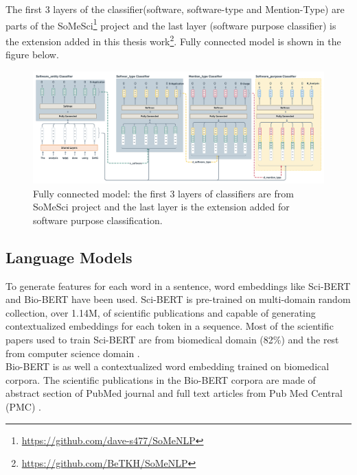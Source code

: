The first 3 layers of the classifier(software, software-type and Mention-Type) are parts of the \ac{SoMeSci}\footnote{\url{https://github.com/dave-s477/SoMeNLP}} project and the last layer (software purpose classifier) is the extension added in this thesis work\footnote{\url{https://github.com/BeTKH/SoMeNLP}}. Fully connected model is shown in the figure below.

\begin{figure}[htbp]
	\centering
	\includegraphics[width=1\textwidth]{4.graphics/figures/ch_5/fully_connected_model}
	\caption{Fully connected model: the first 3 layers of classifiers are from \ac{SoMeSci} project and the last layer is the extension added for software purpose classification.}
	\label{fig:chapter05:setup}
\end{figure}

\subsection{Language Models}
\label{sec:chapter05:DLModels:wemb}

To generate features for each word in a sentence, word embeddings like \ac{Sci-BERT} and \ac{Bio-BERT} have been used. Sci-BERT is pre-trained on multi-domain random collection, over 1.14M, of scientific publications and capable of generating contextualized embeddings for each token in a sequence. Most of the scientific papers used to train Sci-BERT are from biomedical domain (82\%) and the rest from computer science domain \citep{beltagy2019scibert}. \\

Bio-BERT is as well a contextualized word embedding trained on biomedical corpora. The scientific publications in the Bio-BERT corpora are made of abstract section of PubMed journal and full text articles from Pub Med Central (PMC) \citep{li2019fine}. 


